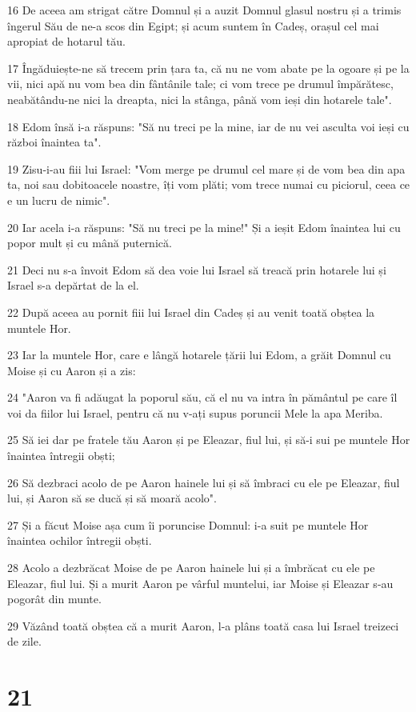 \par 16 De aceea am strigat către Domnul și a auzit Domnul glasul nostru și a trimis îngerul Său de ne-a scos din Egipt; și acum suntem în Cadeș, orașul cel mai apropiat de hotarul tău.
\par 17 Îngăduiește-ne să trecem prin țara ta, că nu ne vom abate pe la ogoare și pe la vii, nici apă nu vom bea din fântânile tale; ci vom trece pe drumul împărătesc, neabătându-ne nici la dreapta, nici la stânga, până vom ieși din hotarele tale".
\par 18 Edom însă i-a răspuns: "Să nu treci pe la mine, iar de nu vei asculta voi ieși cu război înaintea ta".
\par 19 Zisu-i-au fiii lui Israel: "Vom merge pe drumul cel mare și de vom bea din apa ta, noi sau dobitoacele noastre, îți vom plăti; vom trece numai cu piciorul, ceea ce e un lucru de nimic".
\par 20 Iar acela i-a răspuns: "Să nu treci pe la mine!" Și a ieșit Edom înaintea lui cu popor mult și cu mână puternică.
\par 21 Deci nu s-a învoit Edom să dea voie lui Israel să treacă prin hotarele lui și Israel s-a depărtat de la el.
\par 22 După aceea au pornit fiii lui Israel din Cadeș și au venit toată obștea la muntele Hor.
\par 23 Iar la muntele Hor, care e lângă hotarele țării lui Edom, a grăit Domnul cu Moise și cu Aaron și a zis:
\par 24 "Aaron va fi adăugat la poporul său, că el nu va intra în pământul pe care îl voi da fiilor lui Israel, pentru că nu v-ați supus poruncii Mele la apa Meriba.
\par 25 Să iei dar pe fratele tău Aaron și pe Eleazar, fiul lui, și să-i sui pe muntele Hor înaintea întregii obști;
\par 26 Să dezbraci acolo de pe Aaron hainele lui și să îmbraci cu ele pe Eleazar, fiul lui, și Aaron să se ducă și să moară acolo".
\par 27 Și a făcut Moise așa cum îi poruncise Domnul: i-a suit pe muntele Hor înaintea ochilor întregii obști.
\par 28 Acolo a dezbrăcat Moise de pe Aaron hainele lui și a îmbrăcat cu ele pe Eleazar, fiul lui. Și a murit Aaron pe vârful muntelui, iar Moise și Eleazar s-au pogorât din munte.
\par 29 Văzând toată obștea că a murit Aaron, l-a plâns toată casa lui Israel treizeci de zile.

\chapter{21}

